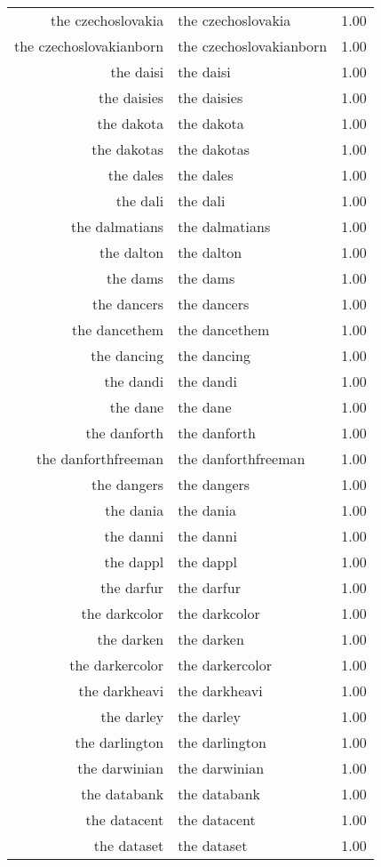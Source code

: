 \begin{table}[ht]
\begin{tabular}{rlr}
  the czechoslovakia & the czechoslovakia & 1.00 \\ 
  the czechoslovakianborn & the czechoslovakianborn & 1.00 \\ 
  the daisi & the daisi & 1.00 \\ 
  the daisies & the daisies & 1.00 \\ 
  the dakota & the dakota & 1.00 \\ 
  the dakotas & the dakotas & 1.00 \\ 
  the dales & the dales & 1.00 \\ 
  the dali & the dali & 1.00 \\ 
  the dalmatians & the dalmatians & 1.00 \\ 
  the dalton & the dalton & 1.00 \\ 
  the dams & the dams & 1.00 \\ 
  the dancers & the dancers & 1.00 \\ 
  the dancethem & the dancethem & 1.00 \\ 
  the dancing & the dancing & 1.00 \\ 
  the dandi & the dandi & 1.00 \\ 
  the dane & the dane & 1.00 \\ 
  the danforth & the danforth & 1.00 \\ 
  the danforthfreeman & the danforthfreeman & 1.00 \\ 
  the dangers & the dangers & 1.00 \\ 
  the dania & the dania & 1.00 \\ 
  the danni & the danni & 1.00 \\ 
  the dappl & the dappl & 1.00 \\ 
  the darfur & the darfur & 1.00 \\ 
  the darkcolor & the darkcolor & 1.00 \\ 
  the darken & the darken & 1.00 \\ 
  the darkercolor & the darkercolor & 1.00 \\ 
  the darkheavi & the darkheavi & 1.00 \\ 
  the darley & the darley & 1.00 \\ 
  the darlington & the darlington & 1.00 \\ 
  the darwinian & the darwinian & 1.00 \\ 
  the databank & the databank & 1.00 \\ 
  the datacent & the datacent & 1.00 \\ 
  the dataset & the dataset & 1.00 \\ 

\end{tabular}
\end{table}
